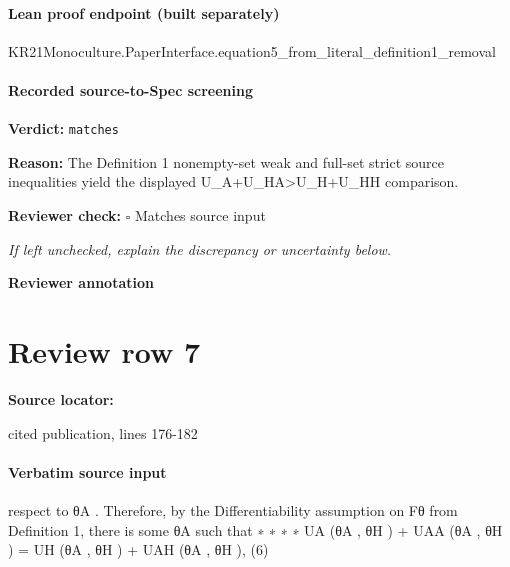 \documentclass[10pt]{article}
\newcommand{\reviewerbox}{%
  \par\noindent\fbox{\parbox{0.96\linewidth}{\rule{0pt}{0.38in}}}\par
}
\newcommand{\reviewmatch}[1]{%
  \par\noindent\textbf{Reviewer check:} $\square$\; #1\par
  \noindent\emph{If left unchecked, explain the discrepancy or uncertainty below.}\par
}
\begin{document}
\paragraph{Lean proof endpoint (built separately)}\begin{ReviewVerbatim}
KR21Monoculture.PaperInterface.equation5_from_literal_definition1_removal
\end{ReviewVerbatim}

\paragraph{Recorded source-to-Spec screening}
\textbf{Verdict:} \texttt{matches}
\\
{\raggedright
\textbf{Reason:} The Definition 1 nonempty-\allowbreak{}set weak and full-\allowbreak{}set strict source inequalities yield the displayed U\_\allowbreak{}A+U\_\allowbreak{}HA>U\_\allowbreak{}H+U\_\allowbreak{}HH comparison.\allowbreak{}
\par}
\reviewmatch{Matches source input}
\noindent\textbf{Reviewer annotation}\par
\reviewerbox
\clearpage
\hypertarget{source-claim-fa14b138c169a341}{}
\section*{Review row 7}
\textbf{Source locator:} {\footnotesize\raggedright cited publication, lines 176-\allowbreak{}182\par}
\paragraph{Verbatim source input}
\begin{ReviewVerbatim}
respect to θA . Therefore, by the Differentiability assumption on Fθ from Definition 1, there is some θA
such that
∗
∗
∗
∗
UA (θA
, θH ) + UAA (θA
, θH ) = UH (θA
, θH ) + UAH (θA
, θH ),
(6)
\end{ReviewVerbatim}
\end{document}
